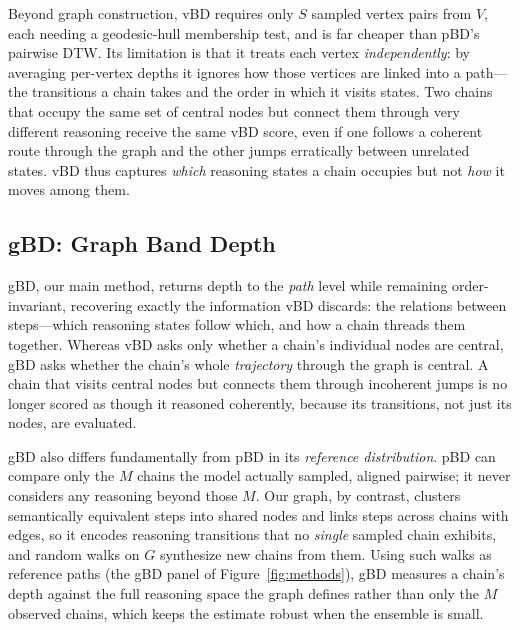 \documentclass[twoside]{article}
\begin{document}
Beyond graph construction, vBD requires only $S$ sampled vertex pairs from $V$,
each needing a geodesic-hull membership test, and is far cheaper than pBD's
pairwise DTW. Its limitation is that it treats each vertex \emph{independently}:
by averaging per-vertex depths it ignores how those vertices are linked into a
path---the transitions a chain takes and the order in which it visits states.
Two chains that occupy the same set of central nodes but connect them through
very different reasoning receive the same vBD score, even if one follows a
coherent route through the graph and the other jumps erratically between
unrelated states. vBD thus captures \emph{which} reasoning states a chain
occupies but not \emph{how} it moves among them.

\subsection{gBD: Graph Band Depth}
\label{sec:method:gbd}

gBD, our main method, returns depth to the \emph{path} level while remaining
order-invariant, recovering exactly the information vBD discards: the relations
between steps---which reasoning states follow which, and how a chain threads them
together. Whereas vBD asks only whether a chain's individual nodes are central,
gBD asks whether the chain's whole \emph{trajectory} through the graph is central.
A chain that visits central nodes but connects them through incoherent jumps is
no longer scored as though it reasoned coherently, because its transitions, not
just its nodes, are evaluated.

gBD also differs fundamentally from pBD in its \emph{reference distribution}. pBD
can compare only the $M$ chains the model actually sampled, aligned pairwise; it
never considers any reasoning beyond those $M$. Our graph, by contrast, clusters
semantically equivalent steps into shared nodes and links steps across chains
with edges, so it encodes reasoning transitions that no \emph{single} sampled
chain exhibits, and random walks on $G$ synthesize new chains from them. Using such
walks as reference paths (the gBD panel of Figure~\ref{fig:methods}), gBD measures
a chain's depth against the full reasoning space the graph defines rather than only
the $M$ observed chains, which keeps the estimate robust when the ensemble is small.
\end{document}

